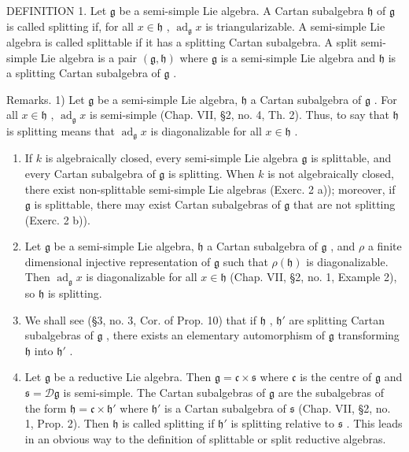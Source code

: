 DEFINITION 1. Let \(\mathfrak{g}\) be a semi-simple Lie algebra. A Cartan subalgebra \(\mathfrak{h}\) of \(\mathfrak{g}\) is called splitting if, for all \(x \in \mathfrak{h}\) , \(\operatorname{ad}_{\mathfrak{g}} x\) is triangularizable. A semi-simple Lie algebra is called splittable if it has a splitting Cartan subalgebra. A split semi-simple Lie algebra is a pair \((\mathfrak{g}, \mathfrak{h})\) where \(\mathfrak{g}\) is a semi-simple Lie algebra and \(\mathfrak{h}\) is a splitting Cartan subalgebra of \(\mathfrak{g}\) .

Remarks. 1) Let \(\mathfrak{g}\) be a semi-simple Lie algebra, \(\mathfrak{h}\) a Cartan subalgebra of \(\mathfrak{g}\) . For all \(x \in \mathfrak{h}\) , \(\operatorname{ad}_{\mathfrak{g}} x\) is semi-simple (Chap. VII, §2, no. 4, Th. 2). Thus, to say that \(\mathfrak{h}\) is splitting means that \(\operatorname{ad}_{\mathfrak{g}} x\) is diagonalizable for all \(x \in \mathfrak{h}\) .

\begin{enumerate}
\def\labelenumi{\arabic{enumi})}
\setcounter{enumi}{1}
\item
  If \(k\) is algebraically closed, every semi-simple Lie algebra \(\mathfrak{g}\) is splittable, and every Cartan subalgebra of \(\mathfrak{g}\) is splitting. When \(k\) is not algebraically closed, there exist non-splittable semi-simple Lie algebras (Exerc. 2 a)); moreover, if \(\mathfrak{g}\) is splittable, there may exist Cartan subalgebras of \(\mathfrak{g}\) that are not splitting (Exerc. 2 b)).
\item
  Let \(\mathfrak{g}\) be a semi-simple Lie algebra, \(\mathfrak{h}\) a Cartan subalgebra of \(\mathfrak{g}\) , and \(\rho\) a finite dimensional injective representation of \(\mathfrak{g}\) such that \(\rho(\mathfrak{h})\) is diagonalizable. Then \(\operatorname{ad}_{\mathfrak{g}}x\) is diagonalizable for all \(x \in \mathfrak{h}\) (Chap. VII, §2, no. 1, Example 2), so \(\mathfrak{h}\) is splitting.
\item
  We shall see (§3, no. 3, Cor. of Prop. 10) that if \(\mathfrak{h}\) , \(\mathfrak{h}'\) are splitting Cartan subalgebras of \(\mathfrak{g}\) , there exists an elementary automorphism of \(\mathfrak{g}\) transforming \(\mathfrak{h}\) into \(\mathfrak{h}'\) .
\item
  Let \(\mathfrak{g}\) be a reductive Lie algebra. Then \(\mathfrak{g} = \mathfrak{c} \times \mathfrak{s}\) where \(\mathfrak{c}\) is the centre of \(\mathfrak{g}\) and \(\mathfrak{s} = \mathcal{D}\mathfrak{g}\) is semi-simple. The Cartan subalgebras of \(\mathfrak{g}\) are the subalgebras of the form \(\mathfrak{h} = \mathfrak{c} \times \mathfrak{h}'\) where \(\mathfrak{h}'\) is a Cartan subalgebra of \(\mathfrak{s}\) (Chap. VII, §2, no. 1, Prop. 2). Then \(\mathfrak{h}\) is called splitting if \(\mathfrak{h}'\) is splitting relative to \(\mathfrak{s}\) . This leads in an obvious way to the definition of splittable or split reductive algebras.
\end{enumerate}
